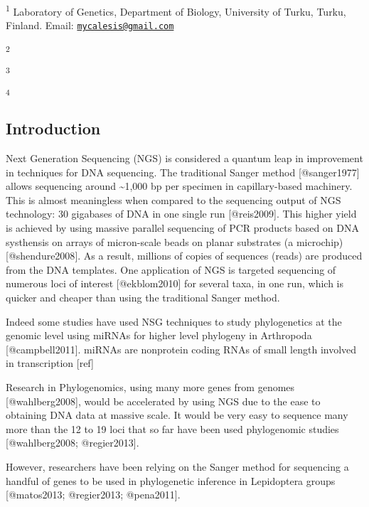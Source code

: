 \documentclass[a4paper]{article}
\author{}
\date{}
\begin{document}
\maketitle

\textsuperscript{1} Laboratory of Genetics, Department of Biology,
University of Turku, Turku, Finland. Email:
\href{mailto:mycalesis@gmail.com}{\texttt{mycalesis@gmail.com}}

\textsuperscript{2}

\textsuperscript{3}

\textsuperscript{4}

\subsection{Introduction}

Next Generation Sequencing (NGS) is considered a quantum leap in
improvement in techniques for DNA sequencing. The traditional Sanger
method {[}@sanger1977{]} allows sequencing around \textasciitilde{}1,000
bp per specimen in capillary-based machinery. This is almost meaningless
when compared to the sequencing output of NGS technology: 30 gigabases
of DNA in one single run {[}@reis2009{]}. This higher yield is achieved
by using massive parallel sequencing of PCR products based on DNA
systhensis on arrays of micron-scale beads on planar substrates (a
microchip) {[}@shendure2008{]}. As a result, millions of copies of
sequences (reads) are produced from the DNA templates. One application
of NGS is targeted sequencing of numerous loci of interest
{[}@ekblom2010{]} for several taxa, in one run, which is quicker and
cheaper than using the traditional Sanger method.

Indeed some studies have used NSG techniques to study phylogenetics at
the genomic level using miRNAs for higher level phylogeny in Arthropoda
{[}@campbell2011{]}. miRNAs are nonprotein coding RNAs of small length
involved in transcription {[}ref{]}

Research in Phylogenomics, using many more genes from genomes
{[}@wahlberg2008{]}, would be accelerated by using NGS due to the ease
to obtaining DNA data at massive scale. It would be very easy to
sequence many more than the 12 to 19 loci that so far have been used
phylogenomic studies {[}@wahlberg2008; @regier2013{]}.

However, researchers have been relying on the Sanger method for
sequencing a handful of genes to be used in phylogenetic inference in
Lepidoptera groups {[}@matos2013; @regier2013; @pena2011{]}.
\end{document}
